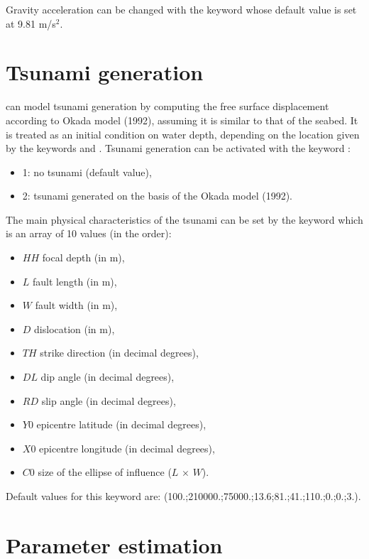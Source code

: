 Gravity acceleration can be changed with the keyword 
whose default value is set at 9.81 m/s$^2$.


\section{Tsunami generation}

 can model tsunami generation by computing the free surface
displacement according to Okada model (1992), assuming it is similar to that
of the seabed.
It is treated as an initial condition on water depth, depending on the
location given by the keywords
 and .
Tsunami generation can be activated with the keyword
:
\begin{itemize}
\item 1: no tsunami (default value),
\item 2: tsunami generated on the basis of the Okada model (1992).
\end{itemize}

The main physical characteristics of the tsunami can be set by the keyword
 which is an array of
10 values (in the order):
\begin{itemize}
\item $HH$ focal depth (in m),
\item $L$ fault length (in m),
\item $W$ fault width (in m),
\item $D$ dislocation (in m),
\item $TH$ strike direction (in decimal degrees),
\item $DL$ dip angle (in decimal degrees),
\item $RD$ slip angle (in decimal degrees),
\item $Y0$ epicentre latitude (in decimal degrees),
\item $X0$ epicentre longitude (in decimal degrees),
\item $C0$ size of the ellipse of influence ($L$ $\times$ $W$).
\end{itemize}
Default values for this keyword are:
(100.;210000.;75000.;13.6;81.;41.;110.;0.;0.;3.).


\section{Parameter estimation}


